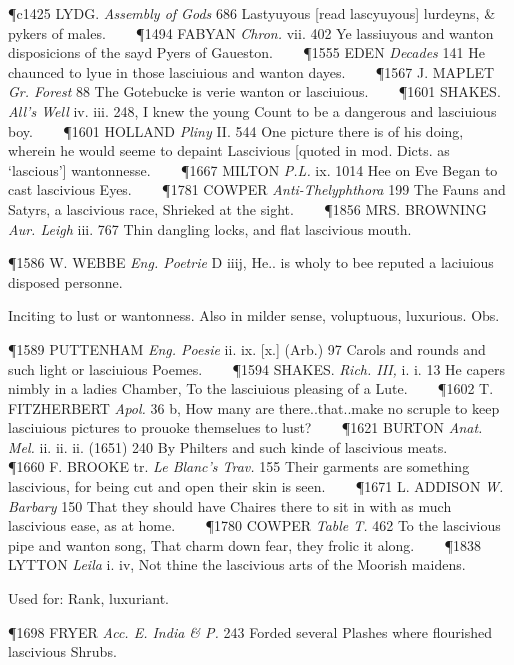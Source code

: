 \begin{description}[wide, labelwidth=!, labelindent=0pt]
\begin{myenumerate}
\P c1425 LYDG.  \textit{Assembly of Gods} 686 Lastyuyous [read lascyuyous] lurdeyns, \& pykers of males.    
\P 1494 FABYAN \textit{Chron.} vii. 402 Ye lassiuyous and wanton disposicions of the sayd Pyers of Gaueston.    
\P 1555 EDEN  \textit{Decades} 141 He chaunced to lyue in those lasciuious and wanton dayes.    
\P 1567 J. MAPLET  \textit{Gr. Forest} 88 The Gotebucke is verie wanton or lasciuious.    
\P 1601 SHAKES.  \textit{All's Well} iv. iii. 248, I knew the young Count to be a dangerous and lasciuious boy.    
\P 1601 HOLLAND  \textit{Pliny} II. 544 One picture there is of his doing, wherein he would seeme to depaint Lascivious [quoted in mod. Dicts. as ‘lascious’] wantonnesse.    
\P 1667 MILTON  \textit{P.L.} ix. 1014 Hee  on Eve Began to cast lascivious Eyes.    
\P 1781 COWPER  \textit{Anti-Thelyphthora} 199 The Fauns and Satyrs, a lascivious race, Shrieked at the sight.    
\P 1856 MRS. BROWNING  \textit{Aur. Leigh} iii. 767 Thin dangling locks, and flat lascivious mouth.

\P 1586 W. WEBBE  \textit{Eng. Poetrie} D iiij, He.. is wholy to bee reputed a laciuious disposed personne.

 Inciting to lust or wantonness. Also in milder sense, voluptuous, luxurious. Obs.

\P 1589 PUTTENHAM  \textit{Eng. Poesie} ii. ix. [x.] (Arb.) 97 Carols and rounds and such light or lasciuious Poemes.    
\P 1594 SHAKES.  \textit{Rich. III,} i. i. 13 He capers nimbly in a ladies Chamber, To the lasciuious pleasing of a Lute.    
\P 1602 T. FITZHERBERT  \textit{Apol.} 36 b, How many are there..that..make no scruple to keep lasciuious pictures to prouoke themselues to lust?    
\P 1621 BURTON  \textit{Anat. Mel.} ii. ii. ii. (1651) 240 By Philters and such kinde of lascivious meats.    
\P 1660 F. BROOKE tr.  \textit{Le Blanc's Trav.} 155 Their garments are something lascivious, for being cut and open their skin is seen.    
\P 1671 L. ADDISON  \textit{W. Barbary} 150 That they should have Chaires there to sit in with as much lascivious ease, as at home.    
\P 1780 COWPER  \textit{Table T.} 462 To the lascivious pipe and wanton song, That charm down fear, they frolic it along.    
\P 1838 LYTTON  \textit{Leila} i. iv, Not thine the lascivious arts of the Moorish maidens.

 Used for: Rank, luxuriant.

\P 1698 FRYER  \textit{Acc. E. India \& P.} 243 Forded several Plashes where flourished lascivious Shrubs.




\end{myenumerate}
\end{description}

